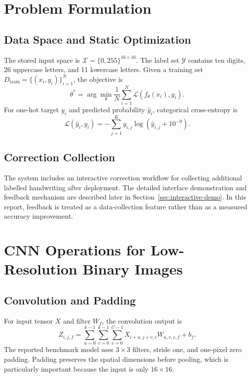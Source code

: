 \documentclass[a4paper,12pt]{extreport}
\begin{document}
\section{Problem Formulation}

\subsection*{Data Space and Static Optimization}
The stored input space is $\mathcal{X}=\{0,255\}^{16\times16}$. The label set $\mathcal{Y}$ contains ten digits, 26 uppercase letters, and 11 lowercase letters. Given a training set $D_{\mathrm{train}}=\{(x_i,y_i)\}_{i=1}^{N}$, the objective is
\begin{equation}
\theta^{*}=\arg\min_{\theta}\frac{1}{N}\sum_{i=1}^{N}
\mathcal{L}(f_{\theta}(x_i),y_i).
\end{equation}
For one-hot target $y_i$ and predicted probability $\hat{y}_i$, categorical cross-entropy is
\begin{equation}
\mathcal{L}(\hat{y}_i,y_i)=-\sum_{j=1}^{K}y_{i,j}\log(\hat{y}_{i,j}+10^{-9}).
\end{equation}

\subsection*{Correction Collection}
The system includes an interactive correction workflow for collecting additional labelled handwriting after deployment. The detailed interface demonstration and feedback mechanism are described later in Section~\ref{sec:interactive-demo}. In this report, feedback is treated as a data-collection feature rather than as a measured accuracy improvement.

\section{CNN Operations for Low-Resolution Binary Images}

\subsection*{Convolution and Padding}
For input tensor $X$ and filter $W_f$, the convolution output is
\begin{equation}
Z_{i,j,f}=\sum_{u=0}^{k-1}\sum_{v=0}^{k-1}\sum_{c=0}^{C-1}
X_{i+u,j+v,c}W_{u,v,c,f}+b_f.
\end{equation}
The reported benchmark model uses $3\times3$ filters, stride one, and one-pixel zero padding. Padding preserves the spatial dimensions before pooling, which is particularly important because the input is only $16\times16$.
\end{document}
